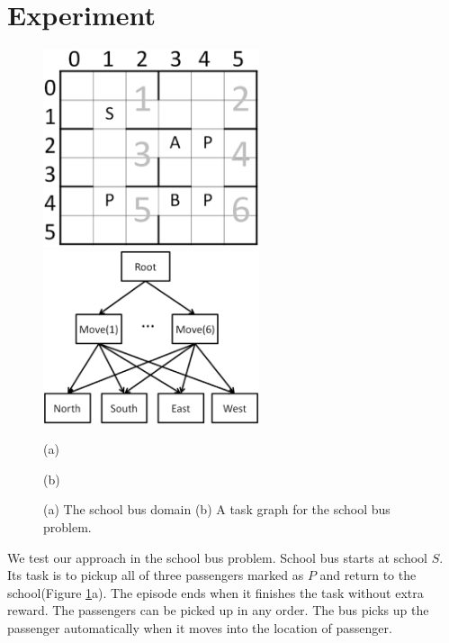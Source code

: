 \documentclass{article} %
\begin{document}
\section{Experiment}

\begin{figure}[t]
 \begin{minipage}[b]{0.5\linewidth}
    \includegraphics[width=2.5in] {BusSmall.eps}
\end{minipage}
\begin{minipage}[b]{0.5\linewidth}
    \includegraphics[width=2.5in] {BusHierarchy.eps}
\end{minipage}
\begin{minipage}[b]{0.5\linewidth} \centering (a) \end{minipage}
\begin{minipage}[b]{0.5\linewidth} \centering (b) \end{minipage}

\caption{(a) The school bus domain (b) A task graph for the school bus problem.}
\label{fig:bus}
\end{figure}

We test our approach in the school bus problem. School bus starts at school $S$. Its task 
is to pickup all of three passengers marked as $P$ and return to the school(Figure \ref{fig:bus}a).
The episode ends when it finishes the task without extra reward. 
The passengers can be picked up in any order. The bus picks up the passenger automatically when it moves into
the location of passenger.
\end{document}
